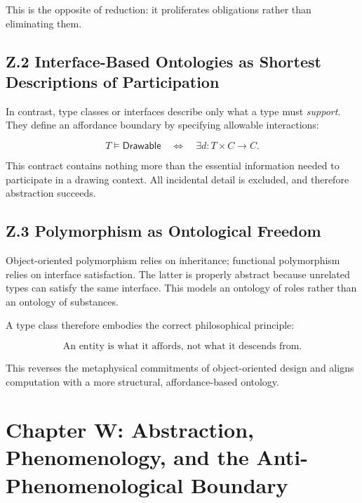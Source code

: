 \documentclass[12pt,letterpaper]{article}
\begin{document}
This is the opposite of reduction: it proliferates obligations rather than eliminating them.

\subsection{Z.2 Interface-Based Ontologies as Shortest Descriptions of Participation}

In contrast, type classes or interfaces describe only what a type must \emph{support}. They define an affordance boundary by specifying allowable interactions:

\[
T \vDash \mathsf{Drawable} \quad \iff \quad \exists d : T \times C \to C.
\]

This contract contains nothing more than the essential information needed to participate in a drawing context. All incidental detail is excluded, and therefore abstraction succeeds.

\subsection{Z.3 Polymorphism as Ontological Freedom}

Object-oriented polymorphism relies on inheritance; functional polymorphism relies on interface satisfaction. The latter is properly abstract because unrelated types can satisfy the same interface. This models an ontology of roles rather than an ontology of substances.

A type class therefore embodies the correct philosophical principle:

\[
\text{An entity is what it affords, not what it descends from.}
\]

This reverses the metaphysical commitments of object-oriented design and aligns computation with a more structural, affordance-based ontology.

\newpage

\section{Chapter W: Abstraction, Phenomenology, and the Anti-Phenomenological Boundary}
\end{document}
